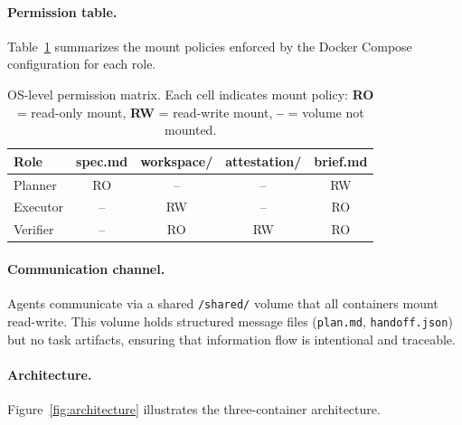 \documentclass{article}
\newcommand{\sys}[1]{\texttt{#1}}
\begin{document}
\paragraph{Permission table.}

Table~\ref{tab:permissions} summarizes the mount policies enforced by the
Docker Compose configuration for each role.

\begin{table}[h]
\centering
\caption{OS-level permission matrix. Each cell indicates mount policy:
  \textbf{RO} = read-only mount, \textbf{RW} = read-write mount,
  \textbf{--} = volume not mounted.}
\label{tab:permissions}
\begin{tabular}{lcccc}
\toprule
\textbf{Role} & \textbf{spec.md} & \textbf{workspace/} & \textbf{attestation/} & \textbf{brief.md} \\
\midrule
Planner  & RO & -- & -- & RW \\
Executor & -- & RW & -- & RO \\
Verifier & -- & RO & RW & RO \\
\bottomrule
\end{tabular}
\end{table}

\paragraph{Communication channel.}
Agents communicate via a shared \sys{/shared/} volume that all containers
mount read-write. This volume holds structured message files
(\sys{plan.md}, \sys{handoff.json}) but no task artifacts, ensuring that
information flow is intentional and traceable.

\paragraph{Architecture.}
Figure~\ref{fig:architecture} illustrates the three-container architecture.
\end{document}

